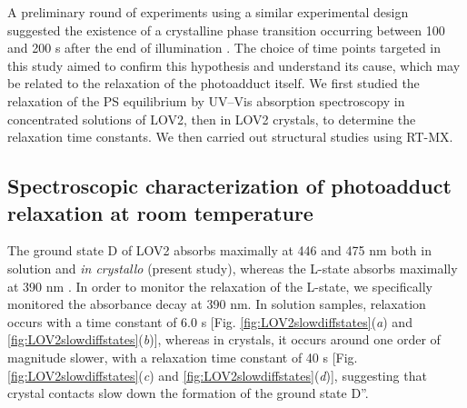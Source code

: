 A preliminary round of experiments using a similar experimental design suggested the existence of a crystalline phase transition occurring between 100 and 200 s after the end of illumination \parencite{aumonierTimeresolvedMonochromaticSynchrotron2019}. The choice of time points targeted in this study aimed to confirm this hypothesis and understand its cause, which may be related to the relaxation of the photoadduct itself. We first studied the relaxation of the PS equilibrium by UV–Vis absorption spectroscopy in concentrated solutions of LOV2, then in LOV2 crystals, to determine the relaxation time constants. We then carried out structural studies using RT-MX.
\subsection{Spectroscopic characterization of photoadduct relaxation at room temperature}
The ground state D of LOV2 absorbs maximally at 446 and 475 nm both in solution and \textit{\textit{in crystallo}} (present study), whereas the L-state absorbs maximally at 390 nm \parencite{swartzPhotocycleFlavinbindingDomain2001}. In order to monitor the relaxation of the L-state, we specifically monitored the absorbance decay at 390 nm. In solution samples, relaxation occurs with a time constant of 6.0 s [Fig. \ref{fig:LOV2slowdiffstates}(\textit{a}) and \ref{fig:LOV2slowdiffstates}(\textit{b})], whereas in crystals, it occurs around one order of magnitude slower, with a relaxation time constant of 40 s [Fig. \ref{fig:LOV2slowdiffstates}(\textit{c}) and \ref{fig:LOV2slowdiffstates}(\textit{d})], suggesting that crystal contacts slow down the formation of the ground state D''.

